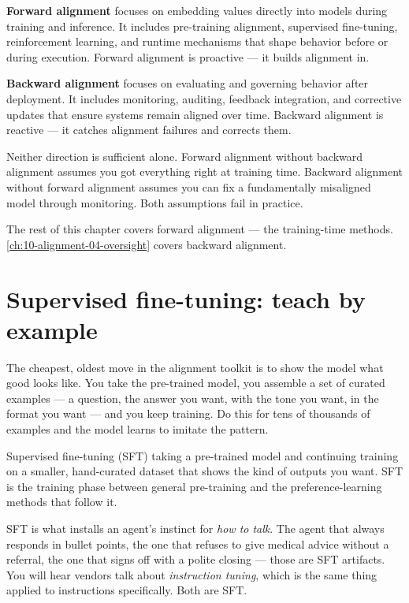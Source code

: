 \textbf{Forward alignment} focuses on embedding values directly into models during training and inference. It includes pre-training alignment, supervised fine-tuning, reinforcement learning, and runtime mechanisms that shape behavior before or during execution. Forward alignment is proactive --- it builds alignment in.

\textbf{Backward alignment} focuses on evaluating and governing behavior after deployment. It includes monitoring, auditing, feedback integration, and corrective updates that ensure systems remain aligned over time. Backward alignment is reactive --- it catches alignment failures and corrects them.

Neither direction is sufficient alone. Forward alignment without backward alignment assumes you got everything right at training time. Backward alignment without forward alignment assumes you can fix a fundamentally misaligned model through monitoring. Both assumptions fail in practice.

The rest of this chapter covers forward alignment --- the training-time methods. \autoref{ch:10-alignment-04-oversight} covers backward alignment.

\section{Supervised fine-tuning: teach by example}

The cheapest, oldest move in the alignment toolkit is to show the model what good looks like. You take the pre-trained model, you assemble a set of curated examples --- a question, the answer you want, with the tone you want, in the format you want --- and you keep training. Do this for tens of thousands of examples and the model learns to imitate the pattern.

\begin{TNdefinition}{Supervised fine-tuning (SFT)} taking a pre-trained model and continuing training on a smaller, hand-curated dataset that shows the kind of outputs you want. SFT is the training phase between general pre-training and the preference-learning methods that follow it. \end{TNdefinition}

SFT is what installs an agent's instinct for \textit{how to talk}. The agent that always responds in bullet points, the one that refuses to give medical advice without a referral, the one that signs off with a polite closing --- those are SFT artifacts. You will hear vendors talk about \textit{instruction tuning}, which is the same thing applied to instructions specifically. Both are SFT.

